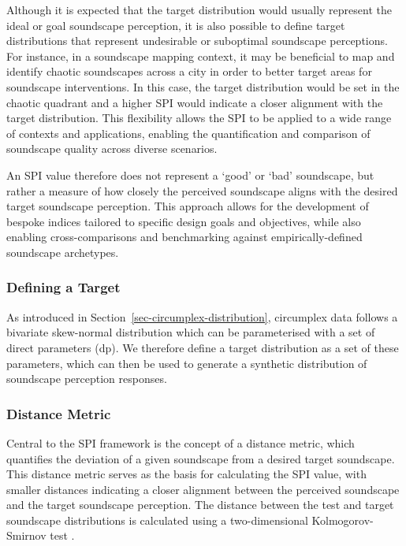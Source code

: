 \documentclass[
  authoryear,
  preprint,
  3p]{elsarticle}
\begin{document}
Although it is expected that the target distribution would usually
represent the ideal or goal soundscape perception, it is also possible
to define target distributions that represent undesirable or suboptimal
soundscape perceptions. For instance, in a soundscape mapping context,
it may be beneficial to map and identify chaotic soundscapes across a
city in order to better target areas for soundscape interventions. In
this case, the target distribution would be set in the chaotic quadrant
and a higher SPI would indicate a closer alignment with the target
distribution. This flexibility allows the SPI to be applied to a wide
range of contexts and applications, enabling the quantification and
comparison of soundscape quality across diverse scenarios.

An SPI value therefore does not represent a `good' or `bad' soundscape,
but rather a measure of how closely the perceived soundscape aligns with
the desired target soundscape perception. This approach allows for the
development of bespoke indices tailored to specific design goals and
objectives, while also enabling cross-comparisons and benchmarking
against empirically-defined soundscape archetypes.

\subsubsection{Defining a Target}\label{defining-a-target}

As introduced in Section~\ref{sec-circumplex-distribution}, circumplex
data follows a bivariate skew-normal distribution which can be
parameterised with a set of direct parameters (dp). We therefore define
a target distribution as a set of these parameters, which can then be
used to generate a synthetic distribution of soundscape perception
responses.

\subsubsection{Distance Metric}\label{distance-metric}

Central to the SPI framework is the concept of a distance metric, which
quantifies the deviation of a given soundscape from a desired target
soundscape. This distance metric serves as the basis for calculating the
SPI value, with smaller distances indicating a closer alignment between
the perceived soundscape and the target soundscape perception. The
distance between the test and target soundscape distributions is
calculated using a two-dimensional Kolmogorov-Smirnov test
\citep{Fasano1987multidimensional}.
\end{document}
